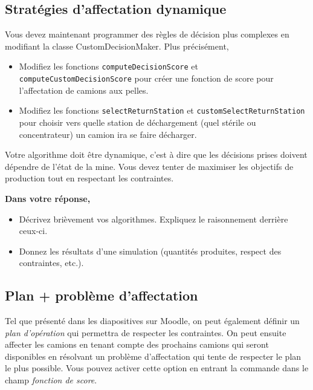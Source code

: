 \subsection{Stratégies d'affectation dynamique}
\label{max_cont:code}

Vous devez maintenant programmer des règles de décision plus complexes en modifiant la classe CustomDecisionMaker. Plus précisément, 

\begin{itemize}
	\item Modifiez les fonctions \verb!computeDecisionScore! et \verb!computeCustomDecisionScore! pour créer une fonction de score pour l'affectation de camions aux pelles.
	\item Modifiez les fonctions \verb!selectReturnStation! et \verb!customSelectReturnStation! pour choisir vers quelle station de déchargement (quel stérile ou concentrateur) un camion ira se faire décharger.
\end{itemize}

Votre algorithme doit être dynamique, c'est à dire que les décisions prises doivent dépendre de l'état de la mine. Vous devez tenter de maximiser les objectifs de production tout en respectant les contraintes.

\vspace{10pt}
\noindent\textbf{Dans votre réponse,} 

\begin{itemize}
	\item Décrivez brièvement vos algorithmes. Expliquez le raisonnement derrière ceux-ci.
	\item Donnez les résultats d'une simulation (quantités produites, respect des contraintes, etc.).
\end{itemize}



\subsection{Plan + problème d'affectation}

Tel que présenté dans les diapositives sur Moodle, on peut également définir un \textit{plan d'opération} qui permettra de respecter les contraintes. On peut ensuite affecter les camions en tenant compte des prochains camions qui seront disponibles en résolvant un problème d'affectation qui tente de respecter le plan le plus possible. Vous pouvez activer cette option en entrant la commande  dans le champ \textit{fonction de score}.

